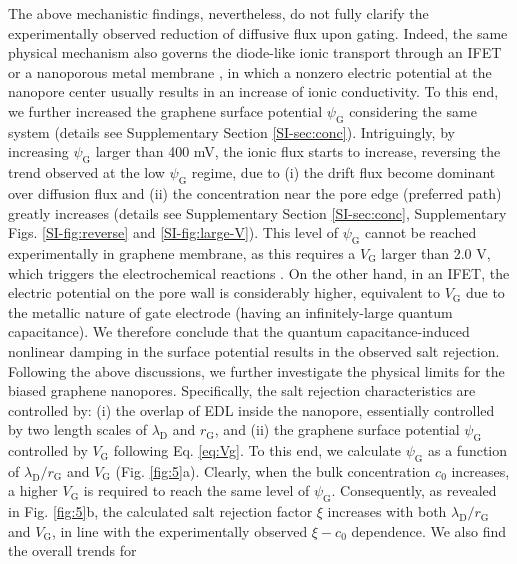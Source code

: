 \documentclass[journal=nalefd,email=true, hyperref=true, keywords=false]{achemso}
\newcommand{\Fig}{Fig.}
\begin{document}
The above mechanistic findings, nevertheless, do not fully clarify the
experimentally observed reduction of diffusive flux upon
gating. Indeed, the same physical mechanism also governs the {
  diode-like ionic transport through an IFET
  \cite{Nam_2009,Lee_2015,Feng_2016} or a nanoporous metal membrane
  \cite{mccurry2017electrolyte}}, in which a nonzero electric
potential at the nanopore center usually results in an increase of
ionic conductivity. To this end, we further increased the graphene
surface potential $\psi_{\mathrm{G}}$ considering the same system
(details see Supplementary Section \ref{SI-sec:conc}). Intriguingly,
by increasing $\psi_{\mathrm{G}}$ larger than 400 mV, the ionic flux
starts to increase, reversing the trend observed at the low
$\psi_{\mathrm{G}}$ regime, due to (i) the drift flux become dominant
over diffusion flux and (ii) the concentration near the pore edge
(preferred path) greatly increases (details see Supplementary Section
\ref{SI-sec:conc}, Supplementary Figs. \ref{SI-fig:reverse} and
\ref{SI-fig:large-V}). This level of $\psi_{\mathrm{G}}$ cannot be
reached experimentally in graphene membrane, as this requires a
$V_{\mathrm{G}}$ larger than 2.0 V, which triggers the electrochemical
reactions \cite{Toh_2011}. On the other hand, in an IFET, the electric
potential on the pore wall is considerably higher, equivalent to
$V_{\mathrm{G}}$ due to the metallic nature of gate electrode (having
an infinitely-large quantum capacitance). We therefore conclude that
the quantum capacitance-induced nonlinear damping in the surface
potential results in the observed salt rejection.  Following the above
discussions, we further investigate the physical limits for the biased
graphene nanopores. Specifically, the salt rejection characteristics
are controlled by: (i) the overlap of EDL inside the nanopore,
essentially controlled by two length scales of $\lambda_{\mathrm{D}}$
and $r_{\mathrm{G}}$, and (ii) the graphene surface potential
$\psi_{\mathrm{G}}$ controlled by $V_{\mathrm{G}}$ following
Eq. \eqref{eq:Vg}. To this end, we calculate $\psi_{\mathrm{G}}$ as a
function of $\lambda_{\mathrm{D}} / r_{\mathrm{G}}$ and
$V_{\mathrm{G}}$ (\Fig{} \ref{fig:5}a). Clearly, when the bulk
concentration $c_{0}$ increases, a higher $V_{\mathrm{G}}$ is required
to reach the same level of $\psi_{\mathrm{G}}$. Consequently, as
revealed in \Fig{} \ref{fig:5}b, the calculated salt rejection factor
$\xi$ increases with both $\lambda_{\mathrm{D}} / r_{\mathrm{G}}$ and
$V_{\mathrm{G}}$, in line with the experimentally observed
$\xi - c_{0}$ dependence. We also find the overall trends for
\end{document}
